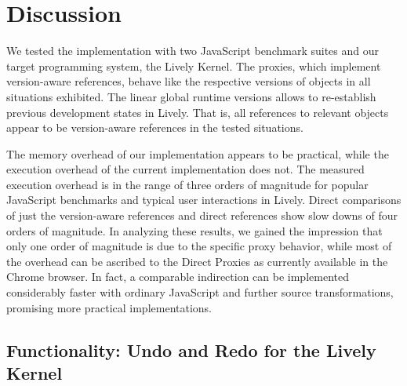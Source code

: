 \chapter{Discussion} \label{sec:DISCUSSION}

We tested the implementation with two JavaScript benchmark suites and our target programming system, the Lively Kernel.
The proxies, which implement version-aware references, behave like the respective versions of objects in all situations exhibited.
The linear global runtime versions allows to re-establish previous development states in Lively.
That is, all references to relevant objects appear to be version-aware references in the tested situations.

The memory overhead of our implementation appears to be practical, while the execution overhead of the current implementation does not.
The measured execution overhead is in the range of three orders of magnitude for popular JavaScript benchmarks and typical user interactions in Lively.
Direct comparisons of just the version-aware references and direct references show slow downs of four orders of magnitude.
In analyzing these results, we gained the impression that only one order of magnitude is due to the specific proxy behavior, while most of the overhead can be ascribed to the Direct Proxies as currently available in the Chrome browser.
In fact, a comparable indirection can be implemented considerably faster with ordinary JavaScript and further source transformations, promising more practical implementations.

\section{Functionality: Undo and Redo for the Lively Kernel}

